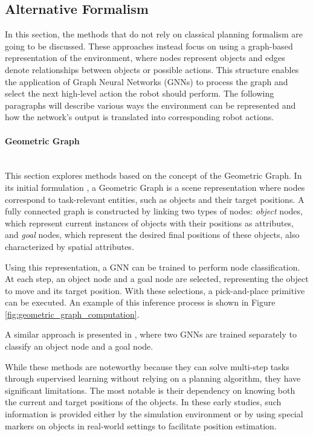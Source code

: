 \subsection{Alternative Formalism}
\label{sec:gnn_alternative_formalism}

In this section, the methods that do not rely on classical planning formalism are going to be discussed. These approaches instead focus on using a graph-based representation of the environment, where nodes represent objects and edges denote relationships between objects or possible actions. This structure enables the application of Graph Neural Networks (GNNs) to process the graph and select the next high-level action the robot should perform. The following paragraphs will describe various ways the environment can be represented and how the network's output is translated into corresponding robot actions.

\paragraph*{Geometric Graph} \mbox{}\\
This section explores methods based on the concept of the Geometric Graph. In its initial formulation \cite{lin2022efficient}, a Geometric Graph is a scene representation where nodes correspond to task-relevant entities, such as objects and their target positions. A fully connected graph is constructed by linking two types of nodes: \textit{object} nodes, which represent current instances of objects with their positions as attributes, and \textit{goal} nodes, which represent the desired final positions of these objects, also characterized by spatial attributes.

Using this representation, a GNN can be trained to perform node classification. At each step, an object node and a goal node are selected, representing the object to move and its target position. With these selections, a pick-and-place primitive can be executed. An example of this inference process is shown in Figure \ref{fig:geometric_graph_computation}.


A similar approach is presented in \cite{di2023one}, where two GNNs are trained separately to classify an object node and a goal node.

While these methods are noteworthy because they can solve multi-step tasks through supervised learning without relying on a planning algorithm, they have significant limitations. The most notable is their dependency on knowing both the current and target positions of the objects. In these early studies, such information is provided either by the simulation environment or by using special markers on objects in real-world settings to facilitate position estimation.

